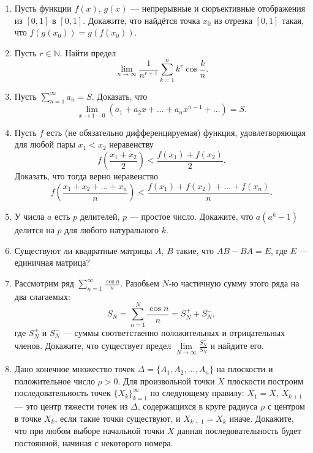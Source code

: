 \begin{enumerate}

\item Пусть функции $f(x)$, $g(x)$ --- непрерывные и сюръективные отображения из $[0, 1]$ в $[0, 1]$. Докажите, что найдётся точка $x_0$ из отрезка $[0, 1]$ такая, что $f(g(x_0)) = g(f(x_0))$.

\item Пусть $r \in\mathbb N$. Найти предел
$$\lim_{n \rightarrow \infty} \frac{1}{n^{r+1}} \sum_{k=1}^n k^r \cos \frac{k}{n}.$$

\item Пусть $\sum\limits_{n=1}^{\infty} a_n = S$. Доказать, что
$$\lim_{x \rightarrow 1 - 0} \left( a_1 + a_2 x + \hdots + a_n x^{n-1} + \hdots \right) = S.$$

\item Пусть $f$ есть (не обязательно дифференцируемая) функция, удовлетворяющая для любой пары $x_1 < x_2$ неравенству
$$ f \left( \frac{x_1 + x_2}{2} \right) < \frac{f(x_1) + f(x_2)}{2}.$$
Доказать, что тогда верно неравенство
$$ f \left( \frac{x_1 + x_2 + \hdots + x_n}{n} \right) < \frac{f(x_1) + f(x_2) + \hdots + f(x_n)}{n}.$$

\item У числа $a$ есть $p$ делителей, $p$ --- простое число. Докажите, что $a (a^k - 1)$ делится на $p$ для любого натурального $k$.

\item Существуют ли квадратные матрицы $A$, $B$ такие, что $AB - BA = E$, где $E$ --- единичная матрица?

\item Рассмотрим ряд $\sum\limits_{n=1}^{\infty} \frac{\cos{n}}{n}$. Разобьем $N$-ю частичную сумму этого ряда на два слагаемых:
$$ S_N = \sum_{n=1}^{N} \frac{\cos{n}}{n} = S_N^{+} + S_N^{-},$$
где $S_N^{+}$ и $S_N^{-}$ --- суммы соответственно положительных и отрицательных членов. Докажите, что существует предел $\lim\limits_{N \rightarrow \infty}{\frac{S_N^{+}}{S_N^{-}}}$ и найдите его.

\item Дано конечное множество точек $\Delta = \{ A_1, A_2, \hdots, A_n \}$ на плоскости и положительное число $\rho > 0$. Для произвольной точки $X$ плоскости построим последовательность точек $\{X_k\}_{k=1}^{\infty}$ по следующему правилу: $X_1 = X$, $X_{k+1}$ --- это центр тяжести точек из $\Delta$, содержащихся в круге радиуса $\rho$ с центром в точке $X_k$, если такие точки существуют, и $X_{k+1} = X_k$ иначе. Докажите, что при любом выборе начальной точки $X$ данная последовательность будет постоянной, начиная с некоторого номера.

\end{enumerate}